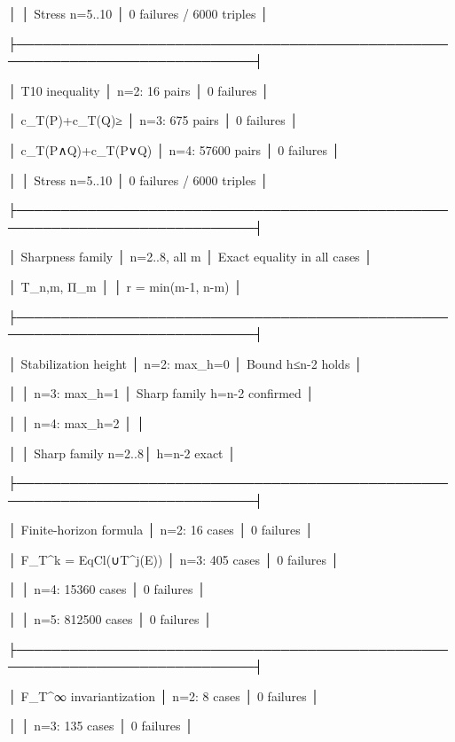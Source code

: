 │                         │ Stress n=5..10     │ 0 failures / 6000 triples    │

├─────────────────────────────────────────────────────────────────────────────┤

│ T10 inequality          │ n=2: 16 pairs      │ 0 failures                   │

│ c_T(P)+c_T(Q)≥         │ n=3: 675 pairs     │ 0 failures                   │

│ c_T(P∧Q)+c_T(P∨Q)      │ n=4: 57600 pairs   │ 0 failures                   │

│                         │ Stress n=5..10     │ 0 failures / 6000 triples    │

├─────────────────────────────────────────────────────────────────────────────┤

│ Sharpness family        │ n=2..8, all m      │ Exact equality in all cases  │

│ T_{n,m}, Π_m            │                    │ r = min(m-1, n-m)            │

├─────────────────────────────────────────────────────────────────────────────┤

│ Stabilization height    │ n=2: max_h=0       │ Bound h≤n-2 holds            │

│                         │ n=3: max_h=1       │ Sharp family h=n-2 confirmed │

│                         │ n=4: max_h=2       │                              │

│                         │ Sharp family n=2..8│ h=n-2 exact                  │

├─────────────────────────────────────────────────────────────────────────────┤

│ Finite-horizon formula  │ n=2: 16 cases      │ 0 failures                   │

│ F_T^k = EqCl(∪T^j(E))   │ n=3: 405 cases     │ 0 failures                   │

│                         │ n=4: 15360 cases   │ 0 failures                   │

│                         │ n=5: 812500 cases  │ 0 failures                   │

├─────────────────────────────────────────────────────────────────────────────┤

│ F_T^∞ invariantization  │ n=2: 8 cases       │ 0 failures                   │

│                         │ n=3: 135 cases     │ 0 failures                   │

